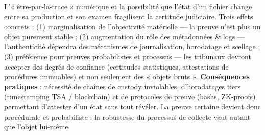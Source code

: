 \documentclass[12pt,a4paper]{article}
\begin{document}
	 L’« être-par-la-trace » numérique et la possibilité que l’état d’un fichier change entre sa production et son examen fragilisent la certitude judiciaire. Trois effets concrets : (1) marginalisation de l’objectivité matérielle — la preuve n’est plus un objet purement stable ; (2) augmentation du rôle des métadonnées \& logs — l’authenticité dépendra des mécanismes de journalisation, horodatage et scellage ; (3) préférence pour preuves probabilistes et processus — les tribunaux devront accepter des degrés de confiance (certitudes statistiques, attestations de procédures immuables) et non seulement des « objets bruts ».
	 \textbf{Conséquences pratiques} : nécessité de chaînes de custody inviolables, d’horodatages tiers (timestamping TSA / blockchain) et de protocoles de preuve (hashs, ZK-proofs) permettant d’attester d’un état sans tout révéler. La preuve certaine devient donc procédurale et probabiliste : la robustesse du processus de collecte vaut autant que l’objet lui-même.
	 
\end{document}
